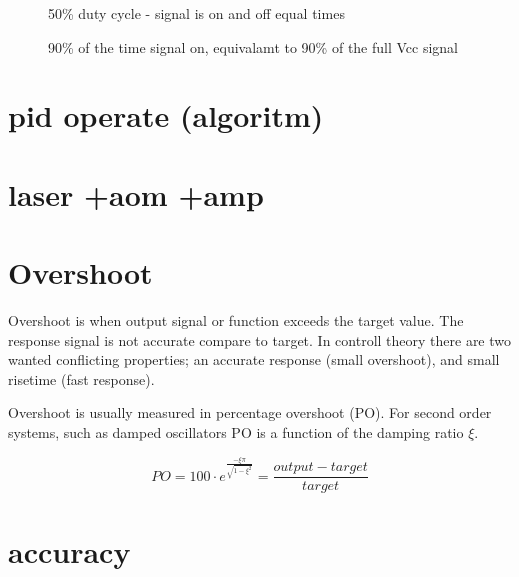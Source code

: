 \documentclass[\main/master.tex]{subfiles}
\begin{document}
\begin{figure}[htbp]
	\centering
	\caption[duty cycle 50\%]{50\% duty cycle  - signal is on and off equal times}
	\label{fig:duty50}
\end{figure}
 
\begin{figure}[htbp]
	\centering
	\caption[duty cycle 90\%]{90\% of the time signal on, equivalamt to 90\% of the full Vcc signal}
	\label{fig:duty90}
\end{figure}














\section{pid operate (algoritm)}
\section{laser +aom +amp}
\doublespacing



\section{Overshoot}
Overshoot is when output signal or function exceeds the target value. The response signal is not accurate compare to target. In controll theory there are two wanted conflicting properties; an accurate response (small overshoot), and small risetime (fast response). 
\par
Overshoot is usually measured in percentage overshoot (PO). For second order systems, such as damped oscillators PO is a function of the damping ratio $\xi$. 


\begin{equation}
PO = 100\cdot e ^{\frac{-\xi\pi}{\sqrt{1-\xi^2}}} = \frac{output-target}{target}   \label{eqn:percentage_overshoot}
\end{equation}
 
\section{accuracy}
\end{document}

